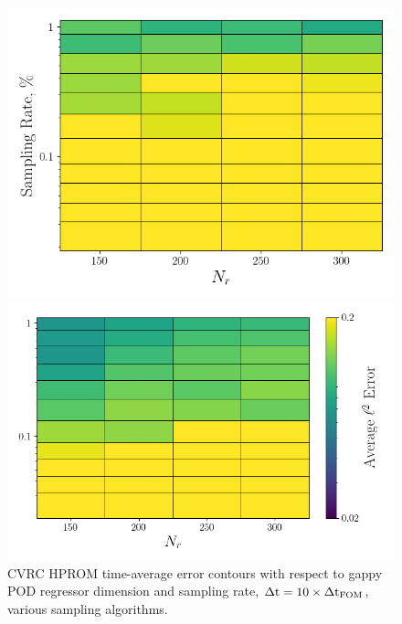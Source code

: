 \begin{figure}
	\begin{minipage}{0.46\linewidth}
		\includegraphics[width=0.99\linewidth]{Chapters/HPROMResults/Images/cvrc/deim/err_contour_gnat1_dt1e-6.png}
	\end{minipage}
	\begin{minipage}{0.53\linewidth}
		\includegraphics[width=0.99\linewidth]{Chapters/HPROMResults/Images/cvrc/deim/err_contour_gnat2_dt1e-6.png}
	\end{minipage}
	\caption{\label{fig:cvrcSampledROMErrContourDt1e-6}CVRC HPROM time-average error contours with respect to gappy POD regressor dimension and sampling rate, $\Delta \text{t} = 10 \times \Delta \text{t}_{\text{FOM}}$, various sampling algorithms.}
\end{figure}

